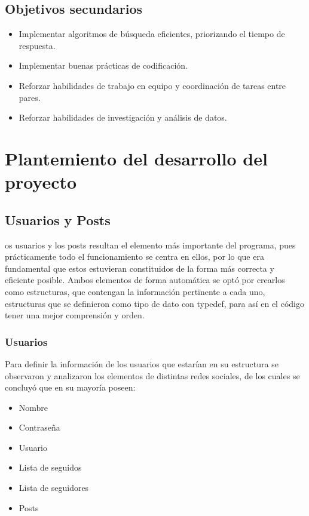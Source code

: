\documentclass[9pt,letterpaper,onecolumn]{rho-class/rho}
\begin{document}
\subsection{Objetivos secundarios}
\begin{itemize}
	\item Implementar algoritmos de búsqueda eficientes, priorizando el tiempo de respuesta.
	\item Implementar buenas prácticas de codificación.
	\item Reforzar habilidades de trabajo en equipo y coordinación de tareas entre pares.
	\item Reforzar habilidades de investigación y análisis de datos.
\end{itemize}

\newpage
\section{Plantemiento del desarrollo del proyecto}


\subsection{Usuarios y Posts}

os usuarios y los posts resultan el elemento más importante del programa, pues prácticamente todo el funcionamiento se centra en ellos, por lo que era fundamental que estos estuvieran constituidos de la forma más correcta y eficiente posible. Ambos elementos de forma automática se optó por crearlos como estructuras, que contengan la información pertinente a cada uno, estructuras que se definieron como tipo de dato con typedef, para así en el código tener una mejor comprensión y orden.

\subsubsection{Usuarios}
Para definir la información de los usuarios que estarían en su estructura se observaron y analizaron los elementos de distintas redes sociales, de los cuales se concluyó que en su mayoría poseen:
\begin{itemize}
	\item Nombre
	\item Contraseña
	\item Usuario
	\item Lista de seguidos
	\item Lista de seguidores
	\item Posts
\end{itemize}
\end{document}

